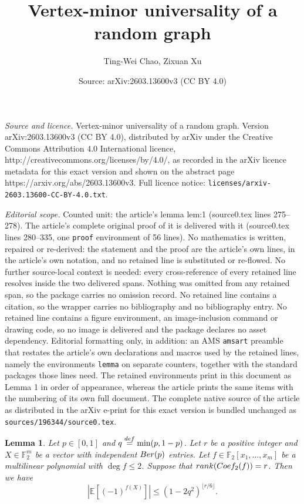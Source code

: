 \documentclass[10pt,a4paper]{amsart}
\title{Vertex-minor universality of a random graph}
\author{Ting-Wei Chao, Zixuan Xu}
\date{Source: arXiv:2603.13600v3 (CC BY 4.0)}
\newtheorem{lemma}{Lemma}
\newcommand{\Ber}{\textup{Ber}}
\newcommand{\Coef}{\textup{Coef}}
\newcommand{\E}{\mathbb{E}}
\newcommand{\F}{\mathbb{F}}
\newcommand{\FF}{\mathbb F}
\newcommand{\abs}[1]{\left|#1\right|}
\def\eqdef{\overset{\rm{def}}{=}}
\renewcommand{\le}{\leqslant}
\renewcommand{\leq}{\le}
\newcommand{\rank}{\textup{rank}}
\begin{document}
\maketitle

\noindent\emph{Source and licence.} Vertex-minor universality of a random graph. Version arXiv:2603.13600v3 (CC BY 4.0), distributed by arXiv under the Creative Commons Attribution 4.0 International licence, http://creativecommons.org/licenses/by/4.0/, as recorded in the arXiv licence metadata for this exact version and shown on the abstract page https://arxiv.org/abs/2603.13600v3. Full licence notice: \texttt{licenses/arxiv-2603.13600-CC-BY-4.0.txt}.\par\smallskip

\noindent\textit{Editorial scope.} Counted unit: the article's lemma lem:1 (source0.tex lines 275--278). The article's complete original proof of it is delivered with it (source0.tex lines 280--335, one \texttt{proof} environment of 56 lines). No mathematics is written, repaired or re-derived: the statement and the proof are the article's own lines, in the article's own notation, and no retained line is substituted or re-flowed.  No further source-local context is needed: every cross-reference of every retained line resolves inside the two delivered spans.  Nothing was omitted from any retained span, so the package carries no omission record.  No retained line contains a citation, so the wrapper carries no bibliography and no bibliography entry.  No retained line contains a figure environment, an image-inclusion command or drawing code, so no image is delivered and the package declares no asset dependency.  Editorial formatting only, in addition: an AMS \texttt{amsart} preamble that restates the article's own declarations and macros used by the retained lines, namely the environments \texttt{lemma} on separate counters, together with the standard packages those lines need.  The retained environments print in this document as Lemma 1 in order of appearance, whereas the article prints the same items with the numbering of its own full document.  The complete native source of the article as distributed in the arXiv e-print for this exact version is bundled unchanged as \texttt{sources/196344/source0.tex}.
\begin{lemma}\label{lem:1}
    Let $p\in [0,1]$ and $q\eqdef\min(p,1-p)$. Let $r$ be a positive integer and $X\in \F_2^m$ be a vector with independent $\Ber(p)$ entries. Let $f\in\FF_2[x_1,\dots,x_m]$ be a multilinear polynomial with $\deg f\leq 2$. Suppose that $\rank(\Coef_2(f))=r$. Then we have
    \[\abs{\E[(-1)^{f(X)}]}\le (1-2q^2)^{\lfloor r/6\rfloor}.\]
\end{lemma}
\end{document}
